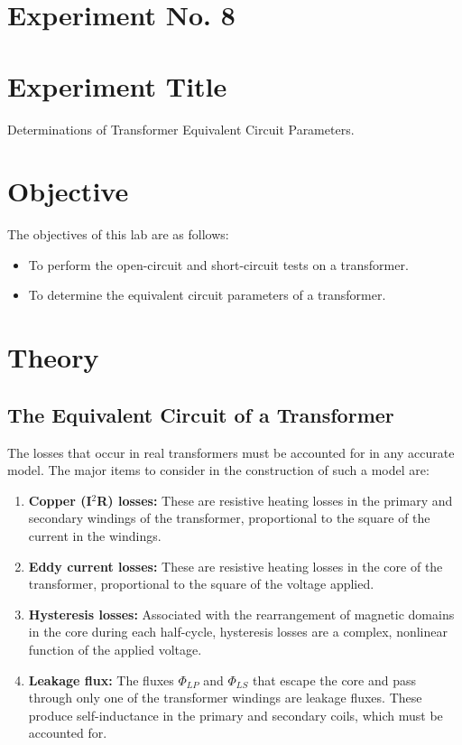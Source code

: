\documentclass[a4paper,12pt]{article}
\begin{document}
	\section{Experiment No. 8}
	
	\section{Experiment Title }
Determinations of Transformer Equivalent Circuit Parameters.
	\section{Objective}
	
	The objectives of this lab are as follows:
	\begin{itemize}
	 \item To perform the open-circuit and short-circuit tests on a transformer.
	\item To determine the equivalent circuit parameters of a transformer.
	\end{itemize}
	
	\section{Theory}
	\subsection{The Equivalent Circuit of a Transformer}
	
	The losses that occur in real transformers must be accounted for in any accurate model. The major items to consider in the construction of such a model are:
	
	\begin{enumerate}
		\item \textbf{Copper (I\(^2\)R) losses:} These are resistive heating losses in the primary and secondary windings of the transformer, proportional to the square of the current in the windings.
		\item \textbf{Eddy current losses:} These are resistive heating losses in the core of the transformer, proportional to the square of the voltage applied.
		\item \textbf{Hysteresis losses:} Associated with the rearrangement of magnetic domains in the core during each half-cycle, hysteresis losses are a complex, nonlinear function of the applied voltage.
		\item \textbf{Leakage flux:} The fluxes $\Phi_{LP}$ and $\Phi_{LS}$ that escape the core and pass through only one of the transformer windings are leakage fluxes. These produce self-inductance in the primary and secondary coils, which must be accounted for.
	\end{enumerate}
	
\end{document}
